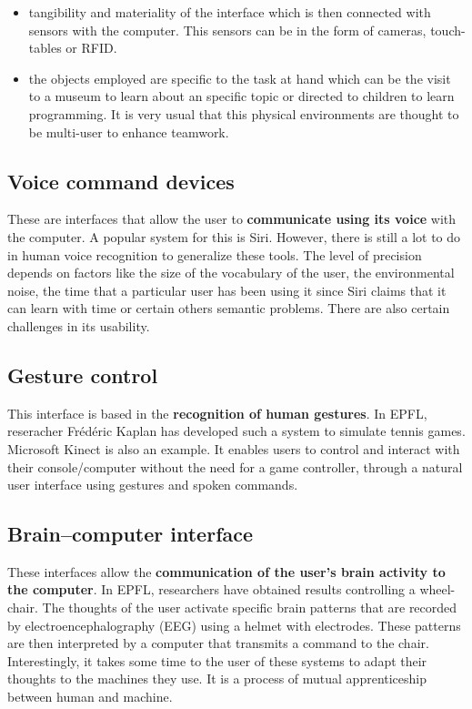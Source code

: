 \begin{itemize}
\item tangibility and materiality of the interface which is then connected with sensors with the computer. This sensors can be in the form of cameras, touch-tables or RFID.
\item the objects employed are specific to the task at hand which can be the visit to a museum to learn about an specific topic or directed to children to learn programming. It is very usual that this physical environments are thought to be multi-user to enhance teamwork. 
\end{itemize}

\subsection{Voice command devices}

These are interfaces that allow the user to \textbf{communicate using its voice} with the computer. A popular system for this is Siri. However, there is still a lot to do in human voice recognition to generalize these tools.  The level of precision depends on factors like the size of the vocabulary of the user, the environmental noise, the time that a particular user has been using it since Siri claims that it can learn with time or certain others semantic problems. There are also certain challenges in its usability.

\subsection{Gesture control}

This interface is based in the \textbf{recognition of human gestures}. In EPFL, reseracher Fr\'ed\'eric Kaplan has developed such a system to simulate tennis games. Microsoft Kinect is also an example. It enables users to control and interact with their console/computer without the need for a game controller, through a natural user interface using gestures and spoken commands.

\subsection{Brain–computer interface}

These interfaces allow the \textbf{communication of the user's brain activity to the computer}. In EPFL, researchers have obtained results controlling a wheel-chair. The thoughts of the user activate specific brain patterns that are recorded by electroencephalography (EEG) using a helmet with electrodes. These patterns are then interpreted by a computer that transmits a command to the chair. Interestingly, it takes some time to the user of these systems to adapt their thoughts to the machines they use. It is a process of mutual apprenticeship between human and machine.

